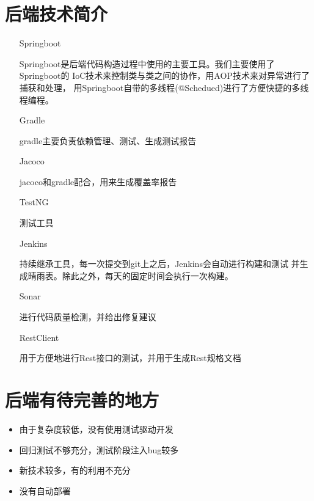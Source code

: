 \documentclass{ctexart}
\begin{document}
    \section{后端技术简介}
    \begin{itemize}
        \item [Springboot] \

            Springboot是后端代码构造过程中使用的主要工具。我们主要使用了Springboot的
            IoC技术来控制类与类之间的协作，用AOP技术来对异常进行了捕获和处理，
            用Springboot自带的多线程(@Schedued)进行了方便快捷的多线程编程。

        \item [Gradle] \

            gradle主要负责依赖管理、测试、生成测试报告

        \item [Jacoco] \

            jacoco和gradle配合，用来生成覆盖率报告

        \item [TestNG] \

            测试工具

        \item [Jenkins] \

            持续继承工具，每一次提交到git上之后，Jenkins会自动进行构建和测试
            并生成晴雨表。除此之外，每天的固定时间会执行一次构建。
        
        \item [Sonar] \

            进行代码质量检测，并给出修复建议

        \item [RestClient] \

            用于方便地进行Rest接口的测试，并用于生成Rest规格文档

    \end{itemize}
    \newpage
    \section{后端有待完善的地方}
        \begin{itemize}
            \item 由于复杂度较低，没有使用测试驱动开发

            \item 回归测试不够充分，测试阶段注入bug较多

            \item 新技术较多，有的利用不充分

            \item 没有自动部署

        \end{itemize}
\end{document}
